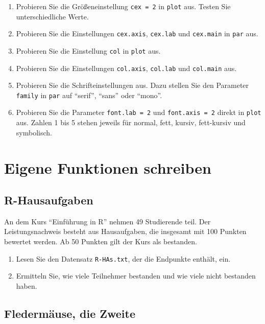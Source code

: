 \documentclass[]{book}
\providecommand{\tightlist}{%
  \setlength{\itemsep}{0pt}\setlength{\parskip}{0pt}}
\begin{document}
\begin{enumerate}
\def\labelenumi{\arabic{enumi}.}
\tightlist
\item
  Probieren Sie die Größeneinstellung \texttt{cex\ =\ 2} in \texttt{plot} aus. Testen Sie unterschiedliche Werte.
\item
  Probieren Sie die Einstellungen \texttt{cex.axis}, \texttt{cex.lab} und \texttt{cex.main} in \texttt{par} aus.
\item
  Probieren Sie die Einstellung \texttt{col} in \texttt{plot} aus.
\item
  Probieren Sie die Einstellungen \texttt{col.axis}, \texttt{col.lab} und \texttt{col.main} aus.
\item
  Probieren Sie die Schrifteinstellungen aus. Dazu stellen Sie den Parameter \texttt{family} in \texttt{par} auf ``serif'', ``sans'' oder ``mono''.
\item
  Probieren Sie die Parameter \texttt{font.lab\ =\ 2} und \texttt{font.axis\ =\ 2} direkt in \texttt{plot} aus. Zahlen 1 bis 5 stehen jeweils für normal, fett, kursiv, fett-kursiv und symbolisch.
\end{enumerate}

\hypertarget{eigene-funktionen-schreiben}{%
\section{Eigene Funktionen schreiben}\label{eigene-funktionen-schreiben}}

\hypertarget{r-hausaufgaben}{%
\subsection{R-Hausaufgaben}\label{r-hausaufgaben}}

An dem Kurs ``Einführung in R'' nehmen 49 Studierende teil. Der Leistungsnachweis besteht aus Hausaufgaben, die insgesamt mit 100 Punkten bewertet werden. Ab 50 Punkten gilt der Kurs als bestanden.

\begin{enumerate}
\def\labelenumi{\arabic{enumi}.}
\tightlist
\item
  Lesen Sie den Datensatz \texttt{R-HAs.txt}, der die Endpunkte enthält, ein.
\item
  Ermitteln Sie, wie viele Teilnehmer bestanden und wie viele nicht bestanden haben.
\end{enumerate}

\hypertarget{fledermuxe4use-die-zweite}{%
\subsection{Fledermäuse, die Zweite}\label{fledermuxe4use-die-zweite}}
\end{document}
